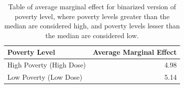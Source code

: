 \begin{table}[ht]
\centering
\caption{Table of average marginal effect for binarized version 
             of poverty level, where poverty levels greater than the median are 
             considered high, and poverty levels lesser than the median 
             are considered low.} 
\label{tab:ett}
\begin{tabular}{lr}
  \hline
Poverty Level & Average Marginal Effect \\ 
  \hline
High Poverty (High Dose) & 4.98 \\ 
  Low Poverty (Low Dose) & 5.14 \\ 
   \hline
\end{tabular}
\end{table}
